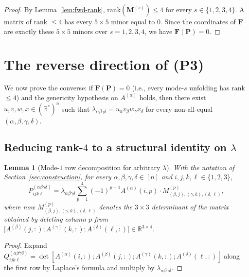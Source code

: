 \documentclass[12pt]{article}
\newtheorem{lemma}[theorem]{Lemma}
\theoremstyle{definition}
\begin{document}
\begin{proof}
By Lemma~\ref{lem:fwd-rank}, $\mathrm{rank}(\mathbf{M}^{(s)})\leq 4$ for every $s\in\{1,2,3,4\}$.
A matrix of rank $\leq 4$ has every $5\times 5$ minor equal to $0$. Since the coordinates
of $\mathbf{F}$ are exactly these $5\times 5$ minors over $s=1,2,3,4$, we have
$\mathbf{F}(\mathbf{P})=0$.
\end{proof}

\section{The reverse direction of (P3)}\label{sec:P3-rev}

We now prove the converse: if $\mathbf{F}(\mathbf{P})=0$ (i.e., every mode-$s$ unfolding has
rank $\leq 4$) and the genericity hypothesis on $A^{(\alpha)}$ holds, then there exist
$u,v,w,x\in(\mathbb{R}^*)^n$ such that $\lambda_{\alpha\beta\gamma\delta}=u_\alpha v_\beta w_\gamma x_\delta$
for every non-all-equal $(\alpha,\beta,\gamma,\delta)$.

\subsection{Reducing rank-$4$ to a structural identity on $\lambda$}

\begin{lemma}[Mode-$1$ row decomposition for arbitrary $\lambda$]\label{lem:abs-rowdecomp}
With the notation of Section~\ref{sec:construction}, for every $\alpha,\beta,\gamma,\delta\in[n]$
and $i,j,k,\ell\in\{1,2,3\}$,
\begin{equation}\label{eq:abs-Laplace}
P^{(\alpha\beta\gamma\delta)}_{ijk\ell}
=\lambda_{\alpha\beta\gamma\delta}\sum_{p=1}^{4}(-1)^{p+1}A^{(\alpha)}(i,p)
\cdot M^{(p)}_{(\beta,j),(\gamma,k),(\delta,\ell)},
\end{equation}
where now $M^{(p)}_{(\beta,j),(\gamma,k),(\delta,\ell)}$ denotes the $3\times 3$ determinant
of the matrix obtained by deleting column $p$ from
$\bigl[A^{(\beta)}(j,:);A^{(\gamma)}(k,:);A^{(\delta)}(\ell,:)\bigr]\in\mathbb{R}^{3\times 4}$.
\end{lemma}

\begin{proof}
Expand $Q^{(\alpha\beta\gamma\delta)}_{ijk\ell}=\det[A^{(\alpha)}(i,:);A^{(\beta)}(j,:);A^{(\gamma)}(k,:);A^{(\delta)}(\ell,:)]$
along the first row by Laplace's formula and multiply by $\lambda_{\alpha\beta\gamma\delta}$.
\end{proof}
\end{document}
